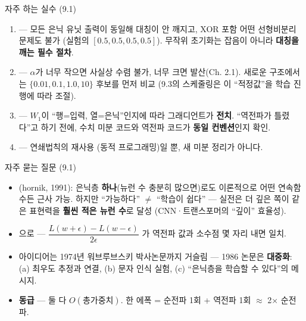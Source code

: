 \documentclass[aspectratio=169,11pt]{beamer}
\begin{document}
\begin{frame}{자주 하는 실수 (9.1)}
  \small
  \begin{enumerate}
    \item {} — 모든 은닉 유닛 출력이 동일해
      대칭이 안 깨지고, XOR 포함 어떤 선형비분리 문제도 불가
      (실험의 $[0.5,0.5,0.5,0.5]$). 무작위 초기화는 잡음이 아니라
      \textbf{대칭을 깨는 필수 절차}.
    \item {} — $\alpha$가 너무 작으면 사실상 수렴
      불가, 너무 크면 발산(Ch. 2.1). 새로운 구조에서는
      $\{0.01, 0.1, 1.0, 10\}$ 후보를 먼저 비교 (9.3의 스케줄링은
      이 ``적정값''을 학습 진행에 따라 조절).
    \item {} — $W_1$이 ``행=입력, 열=은닉''인지에 따라
      그래디언트가 \textbf{전치}. ``역전파가 틀렸다''고 하기 전에,
      수치 미분 코드와 역전파 코드가 \textbf{동일 컨벤션}인지 확인.
    \item {} — 연쇄법칙의 재사용
      (동적 프로그래밍)일 뿐, 새 미분 정리가 아니다.
  \end{enumerate}
\end{frame}

\begin{frame}{자주 묻는 질문 (9.1)}
  \small
  \begin{itemize}
    \item {}
      (hornik, 1991): 은닉층 \textbf{하나}(뉴런 수 충분히
      많으면)로도 이론적으로 어떤 연속함수든 근사 가능. 하지만
      ``가능하다'' $\neq$ ``학습이 쉽다'' — 실전은 더 깊은 쪽이
      같은 표현력을 \textbf{훨씬 적은 뉴런 수}로 달성 (CNN·트랜스포머의
      ``깊이'' 효율성).
    \item {}
      으로 — $\dfrac{L(w+\epsilon)-L(w-\epsilon)}{2\epsilon}$
      가 역전파 값과 소수점 몇 자리 내면 일치.
    \item {}
      아이디어는 1974년 워브루브스키 박사논문까지 거슬림 — 1986 논문은
      \textbf{대중화}: (a) 최우도 추정과 연결, (b) 문자 인식 실험,
      (c) ``은닉층을 학습할 수 있다''의 메시지.
    \item {}
      \textbf{동급} — 둘 다 $O(\text{총가중치})$.
      한 에폭 = 순전파 1회 + 역전파 1회 $\approx$ 2$\times$ 순전파.
  \end{itemize}
\end{frame}
\end{document}

